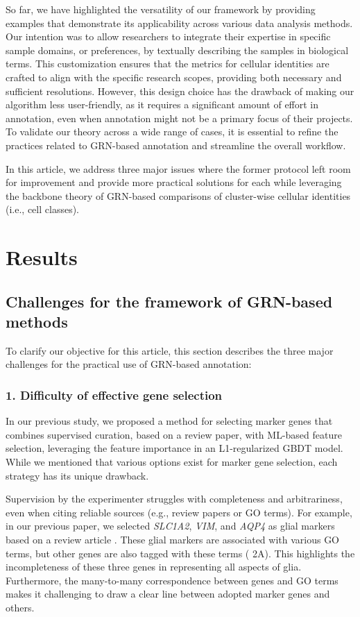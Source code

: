 \documentclass{article}
\begin{document}
So far, we have highlighted the versatility of our framework by providing examples that demonstrate its applicability 
across various data analysis methods. Our intention was to allow researchers to integrate their expertise 
in specific sample domains, or preferences, by textually describing the samples in biological terms. This customization 
ensures that the metrics for cellular identities are crafted to align with the specific research scopes, providing both 
necessary and sufficient resolutions. However, this design choice has the drawback of making our algorithm less 
user-friendly, as it requires a significant amount of effort in annotation, even when annotation might not be a 
primary focus of their projects. To validate our theory across a wide range of cases, it is essential to refine the 
practices related to GRN-based annotation and streamline the overall workflow.

In this article, we address three major issues where the former protocol left room for improvement and provide 
more practical solutions for each while leveraging the backbone theory of GRN-based comparisons of cluster-wise
cellular identities (i.e., cell classes).

\section*{Results}
\subsection*{Challenges for the framework of GRN-based methods}
To clarify our objective for this article, this section describes the three major challenges for the practical use of 
GRN-based annotation:

\subsubsection*{1. Difficulty of effective gene selection}
In our previous study, we proposed a method for selecting marker genes that combines supervised curation, based 
on a review paper, with ML-based feature selection, leveraging the feature importance in an L1-regularized GBDT 
model. While we mentioned that various options exist for marker gene selection, each strategy has its unique 
drawback.

Supervision by the experimenter struggles with completeness and arbitrariness, even when citing reliable sources 
(e.g., review papers or GO terms). For example, in our previous paper, we selected \textit{SLC1A2}, \textit{VIM}, and \textit{AQP4} as 
glial markers based on a review article \cite{zhang2015molecular}. These glial markers are associated with various GO terms, but other 
genes are also tagged with these terms (\figurename{ 2A}). This highlights the incompleteness of these three genes in 
representing all aspects of glia. Furthermore, the many-to-many correspondence between genes and GO terms 
makes it challenging to draw a clear line between adopted marker genes and others.
\end{document}
